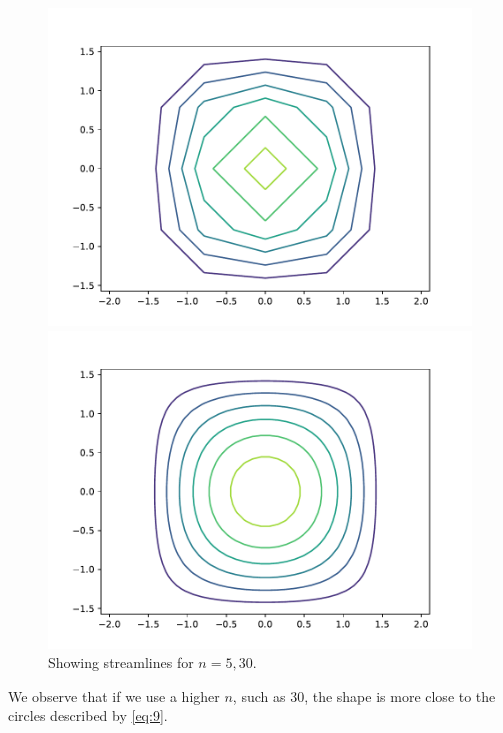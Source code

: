 \documentclass[a4paper,10pt,english]{article}
\begin{document}
\begin{figure}[h]
    \centering
    \begin{minipage}{0.5\textwidth}
        \centering 
        \includegraphics[scale=.5]{figures/figure_4_a_i.pdf}
    \end{minipage}\hfill
    \begin{minipage}{0.5\textwidth}
        \centering 
        \includegraphics[scale=.5]{figures/figure_4_a_ii.pdf}
    \end{minipage}
    \caption{Showing streamlines for $n=5, 30$.}
    \label{fig:stremalines}
\end{figure}
We observe that if we use a higher $n$, such as 30, the shape is more close to the circles described by \eqref{eq:9}. 
\end{document}
